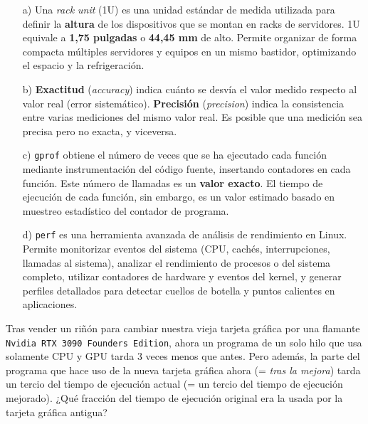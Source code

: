 \documentclass[a4paper,12pt]{article}
\begin{document}
\begin{itemize}
    \item[a)] Una \textit{rack unit} (1U) es una unidad estándar de medida utilizada para definir la \textbf{altura} de los dispositivos que se montan en racks de servidores. 1U equivale a \textbf{1,75 pulgadas} o \textbf{44,45 mm} de alto. Permite organizar de forma compacta múltiples servidores y equipos en un mismo bastidor, optimizando el espacio y la refrigeración.

    \item[b)] \textbf{Exactitud} (\textit{accuracy}) indica cuánto se desvía el valor medido respecto al valor real (error sistemático). \textbf{Precisión} (\textit{precision}) indica la consistencia entre varias mediciones del mismo valor real. Es posible que una medición sea precisa pero no exacta, y viceversa.

    \item[c)] \texttt{gprof} obtiene el número de veces que se ha ejecutado cada función mediante instrumentación del código fuente, insertando contadores en cada función. Este número de llamadas es un \textbf{valor exacto}. El tiempo de ejecución de cada función, sin embargo, es un valor estimado basado en muestreo estadístico del contador de programa.

    \item[d)] \texttt{perf} es una herramienta avanzada de análisis de rendimiento en Linux. Permite monitorizar eventos del sistema (CPU, cachés, interrupciones, llamadas al sistema), analizar el rendimiento de procesos o del sistema completo, utilizar contadores de hardware y eventos del kernel, y generar perfiles detallados para detectar cuellos de botella y puntos calientes en aplicaciones.
\end{itemize}

\begin{tcolorbox}[colback=white!95!gray, colframe=black, title=6.- (0.75 puntos)]
Tras vender un riñón para cambiar nuestra vieja tarjeta gráfica por una flamante \texttt{Nvidia RTX 3090 Founders Edition}, ahora un programa de un solo hilo que usa solamente CPU y GPU tarda 3 veces menos que antes. Pero además, la parte del programa que hace uso de la nueva tarjeta gráfica ahora (= \textit{tras la mejora}) tarda un tercio del tiempo de ejecución actual (= un tercio del tiempo de ejecución mejorado). ¿Qué fracción del tiempo de ejecución original era la usada por la tarjeta gráfica antigua?
\end{tcolorbox}
\end{document}
